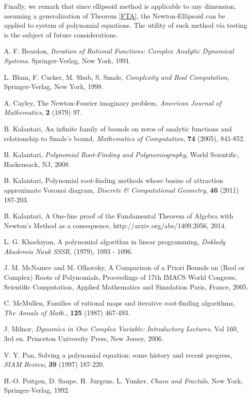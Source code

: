 \documentclass{article}
\begin{document}
Finally, we remark that since ellipsoid method is applicable to any dimension, assuming a generalization of Theorem \ref{FTA}, the Newton-Ellipsoid can be applied to system of polynomial equations. The utility of such method via testing is the subject of future considerations. 
\begin{thebibliography}{9}

 A. F. Beardon, {\em Iteration of Rational Functions: Complex Analytic Dynamical Systems}. Springer-Verlag, New York, 1991.

  L. Blum, F. Cucker, M. Shub, S. Smale, \textit{Complexity and Real Computation}, Springer-Verlag, New York, 1998.\filbreak

 A. Cayley, The Newton-Fourier imaginary problem,
{\it American Journal of Mathematics}, \textbf{2} (1879) 97.\filbreak

 B. Kalantari, An infinite family of bounds on
zeros of analytic functions and relationship to Smale's bound, {\it
Mathematics of Computation}, \textbf{74} (2005), 841-852. \filbreak

 B. Kalantari, \textit{Polynomial Root-Finding and Polynomiography}, World Scientific,  Hackensack, NJ, 2008.\filbreak

 B.  Kalantari,  Polynomial root-finding methods whose basins of attraction approximate Voronoi diagram,  \emph{Discrete \& Computational Geometry},  \textbf{46}  (2011) 187-203.\filbreak

 B. Kalantari, A One-line proof of the Fundamental Theorem of Algebra with Newton's Method as a consequence, http://arxiv.org/abs/1409.2056,  2014. \filbreak

 L. G. Khachiyan, A polynomial algorithm in linear programming, {\it Doklady Akademia Nauk SSSR},
(1979), 1093 - 1096.\filbreak

 J. M. McNamee and M. Olhovsky, A Comparison of a Priori Bounds on (Real or Complex) Roots of Polynomials, Proceedings of 17th IMACS World Congress, Scientific Computation, Applied Mathematics and
Simulation Paris, France, 2005. \filbreak

 C. McMullen, Families of rational maps and iterative root-finding algorithms, {\it The Annals of Math.}, \textbf{125}  (1987) 467-493. \filbreak

 J. Milnor, {\em Dynamics in One Complex Variable:
Introductory Lectures}, Vol 160, 3rd en. Princeton University Press, New Jersey, 2006. \filbreak

 V. Y. Pan, Solving a polynomial equation: some
history and recent progress, \emph{SIAM Review}, \textbf{39} (1997) 187-220.\filbreak

 H.-O. Peitgen, D. Saupe, H. Jurgens, L. Yunker,
{\it Chaos and Fractals}, New York, Springer-Verlag, 1992.\filbreak

\end{thebibliography}

\bigskip
\end{document}
